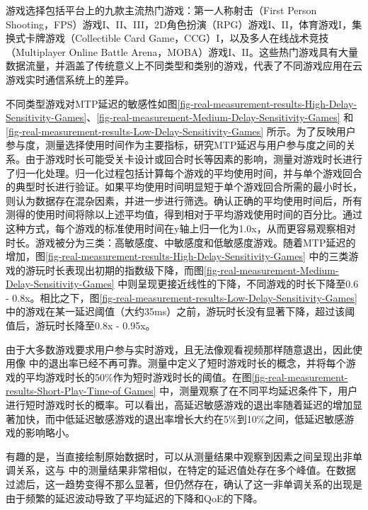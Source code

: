 游戏选择包括平台上的九款主流热门游戏：第一人称射击（First Person Shooting，FPS）游戏I、II、III，2D角色扮演（RPG）游戏I、II，体育游戏I，集换式卡牌游戏（Collectible Card Game，CCG）I，以及多人在线战术竞技（Multiplayer Online Battle Arena，MOBA）游戏I、II。这些热门游戏具有大量数据流量，并涵盖了传统意义上不同类型和类别的游戏，代表了不同游戏应用在云游戏实时通信系统上的差异。

不同类型游戏对MTP延迟的敏感性如图\ref{fig-real-measurement-results-High-Delay-Sensitivity-Games}、\ref{fig-real-measurement-Medium-Delay-Sensitivity-Games} 和 \ref{fig-real-measurement-results-Low-Delay-Sensitivity-Games} 所示。为了反映用户参与度，测量选择使用时间作为主要指标，研究MTP延迟与用户参与度之间的关系。由于游戏时长可能受关卡设计或回合时长等因素的影响，测量对游戏时长进行了归一化处理。归一化过程包括计算每个游戏的平均使用时间，并与单个游戏回合的典型时长进行验证。如果平均使用时间明显短于单个游戏回合所需的最小时长，则认为数据存在混杂因素，并进一步进行筛选。确认正确的平均使用时间后，所有测得的使用时间将除以上述平均值，得到相对于平均游戏使用时间的百分比。通过这种方式，每个游戏的标准使用时间在y轴上归一化为1.0x，从而更容易观察相对时长。游戏被分为三类：高敏感度、中敏感度和低敏感度游戏。随着MTP延迟的增加，图\ref{fig-real-measurement-results-High-Delay-Sensitivity-Games} 中的三类游戏的游玩时长表现出初期的指数级下降，而图\ref{fig-real-measurement-Medium-Delay-Sensitivity-Games} 中则呈现更接近线性的下降，不同游戏的时长下降至0.6 - 0.8x。相比之下，图\ref{fig-real-measurement-results-Low-Delay-Sensitivity-Games} 中的游戏在某一延迟阈值（大约35ms）之前，游玩时长没有显著下降，超过该阈值后，游玩时长降至0.8x - 0.95x。


由于大多数游戏要求用户参与实时游戏，且无法像观看视频那样随意退出，因此使用像 \cite{chengrebuffering} 中的退出率已经不再可靠。测量中定义了短时游戏时长的概念，并将每个游戏的平均游戏时长的50\%作为短时游戏时长的阈值。在图\ref{fig-real-measurement-results-Short-Play-Time-of Games} 中，测量观察了在不同平均延迟条件下，用户进行短时游戏时长的概率。可以看出，高延迟敏感游戏的退出率随着延迟的增加显著加快，而中低延迟敏感游戏的退出率增长大约在5\%到10\%之间，低延迟敏感游戏的影响略小。


有趣的是，当直接绘制原始数据时，可以从测量结果中观察到因素之间呈现出非单调关系，这与 \cite{balachandran2013developing} 中的测量结果非常相似，在特定的延迟值处存在多个峰值。在数据过滤后，这一趋势变得不那么显著，但仍然存在，确认了这一非单调关系的出现是由于频繁的延迟波动导致了平均延迟的下降和QoE的下降。

